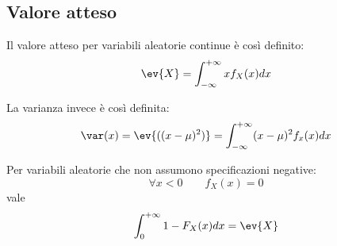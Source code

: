 \subsection{Valore atteso}
\begin{defin}
	Il valore atteso per variabili aleatorie continue è così definito:
	\begin{equation*}
		\ev{X}=\int_{-\infty}^{+\infty} x f_X(x)dx
	\end{equation*}
\end{defin}

La varianza invece è così definita:
\begin{equation*}
	\var(x) = \ev{((x- \mu)^2) }= \int_{-\infty}^{+\infty} (x-\mu)^2 f_x(x)dx
\end{equation*}

\begin{prop} \label{prop:valatnonneg}
	Per variabili aleatorie che non assumono specificazioni negative:
	\begin{equation*}
		\forall x<0 \qquad f_X(x)=0
	\end{equation*}
	vale
	\begin{equation*}
		\int_0^{+\infty} 1-F_X(x)dx = \ev{X}
	\end{equation*}
\end{prop}

